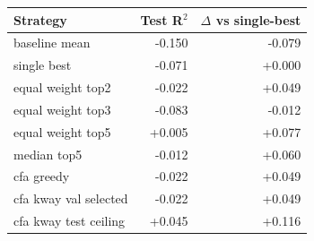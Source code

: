 \begin{tabular}{lrr}
\toprule
Strategy & Test R$^2$ & $\Delta$ vs single-best \\
\midrule
baseline mean & -0.150 & -0.079 \\
single best & -0.071 & +0.000 \\
equal weight top2 & -0.022 & +0.049 \\
equal weight top3 & -0.083 & -0.012 \\
equal weight top5 & +0.005 & +0.077 \\
median top5 & -0.012 & +0.060 \\
cfa greedy & -0.022 & +0.049 \\
cfa kway val selected & -0.022 & +0.049 \\
cfa kway test ceiling & +0.045 & +0.116 \\
\bottomrule
\end{tabular}